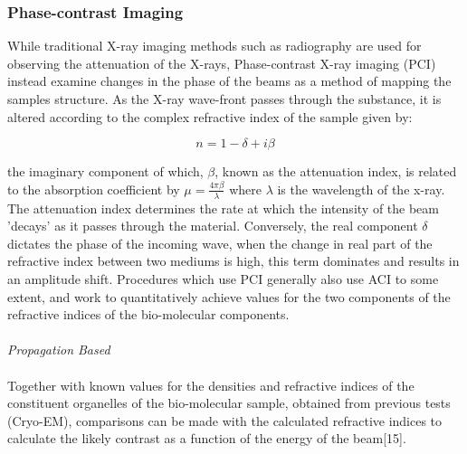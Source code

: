 \documentclass[11pt]{report}
\begin{document}
\subsubsection{Phase-contrast Imaging}

While traditional X-ray imaging methods such as radiography are used for observing the attenuation of the X-rays, Phase-contrast X-ray imaging (PCI) instead examine changes in the phase of the beams as a method of mapping the samples structure. As the X-ray wave-front passes through the substance, it is altered according to the complex refractive index of the sample given by:

$$ n = 1 - \delta +i\beta$$

the imaginary component of which, $\beta$, known as the attenuation index, is related to the absorption coefficient by $\mu = \frac{4\pi \beta}{\lambda}$ where $\lambda$ is the wavelength of the x-ray. The attenuation index determines the rate at which the intensity of the beam 'decays' as it passes through the material. Conversely, the real component $\delta$ dictates the phase of the incoming wave, when the change in real part of the refractive index between two mediums is high, this term dominates and results in an amplitude shift. Procedures which use PCI generally also use ACI to some extent, and work to quantitatively achieve values for the two components of the refractive indices of the bio-molecular components. 
\\
\\
\textit{Propagation Based}
\\
\\
Together with known values for the densities and refractive indices of the constituent organelles of the bio-molecular sample, obtained from previous tests (Cryo-EM), comparisons can be made with the calculated refractive indices to calculate the likely contrast as a function of the energy of the beam[15].
\end{document}
